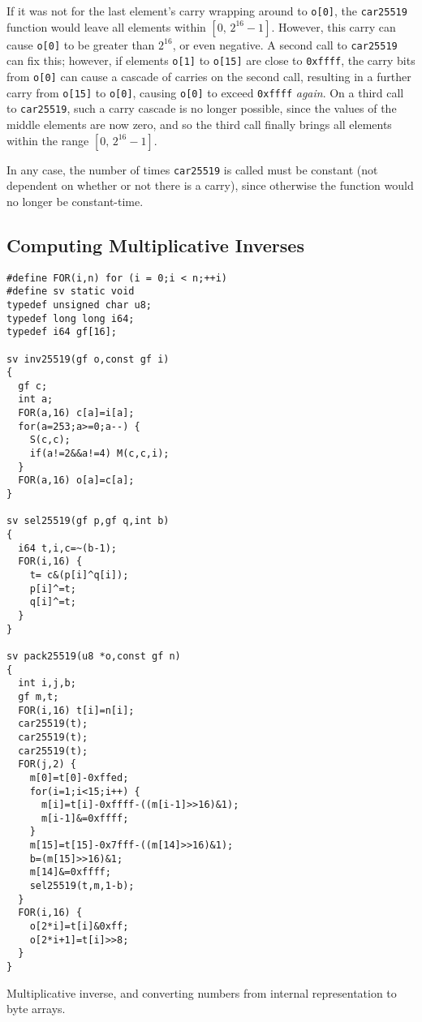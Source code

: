 \documentclass{article}
\begin{document}
If it was not for the last element's carry wrapping around to \verb|o[0]|, the \verb|car25519| function would leave all elements within $[0,\, 2^{16}-1]$.
However, this carry can cause \verb|o[0]| to be greater than $2^{16}$, or even negative.
A second call to \verb|car25519| can fix this; however, if elements \verb|o[1]| to \verb|o[15]| are close to \verb|0xffff|, the carry bits from \verb|o[0]| can cause a cascade of carries on the second call, resulting in a further carry from \verb|o[15]| to \verb|o[0]|, causing \verb|o[0]| to exceed \verb|0xffff| \emph{again}.
On a third call to \verb|car25519|, such a carry cascade is no longer possible, since the values of the middle elements are now zero, and so the third call finally brings all elements within the range $[0,\, 2^{16}-1]$.

In any case, the number of times \verb|car25519| is called must be constant (not dependent on whether or not there is a carry), since otherwise the function would no longer be constant-time.

\subsection{Computing Multiplicative Inverses}\label{sec:inverse}

\begin{listing}
\begin{verbatim}
#define FOR(i,n) for (i = 0;i < n;++i)
#define sv static void
typedef unsigned char u8;
typedef long long i64;
typedef i64 gf[16];

sv inv25519(gf o,const gf i)
{
  gf c;
  int a;
  FOR(a,16) c[a]=i[a];
  for(a=253;a>=0;a--) {
    S(c,c);
    if(a!=2&&a!=4) M(c,c,i);
  }
  FOR(a,16) o[a]=c[a];
}

sv sel25519(gf p,gf q,int b)
{
  i64 t,i,c=~(b-1);
  FOR(i,16) {
    t= c&(p[i]^q[i]);
    p[i]^=t;
    q[i]^=t;
  }
}

sv pack25519(u8 *o,const gf n)
{
  int i,j,b;
  gf m,t;
  FOR(i,16) t[i]=n[i];
  car25519(t);
  car25519(t);
  car25519(t);
  FOR(j,2) {
    m[0]=t[0]-0xffed;
    for(i=1;i<15;i++) {
      m[i]=t[i]-0xffff-((m[i-1]>>16)&1);
      m[i-1]&=0xffff;
    }
    m[15]=t[15]-0x7fff-((m[14]>>16)&1);
    b=(m[15]>>16)&1;
    m[14]&=0xffff;
    sel25519(t,m,1-b);
  }
  FOR(i,16) {
    o[2*i]=t[i]&0xff;
    o[2*i+1]=t[i]>>8;
  }
}
\end{verbatim}
\caption{Multiplicative inverse, and converting numbers from internal representation to byte arrays.}\label{code:pack25519}
\end{listing}
\end{document}
